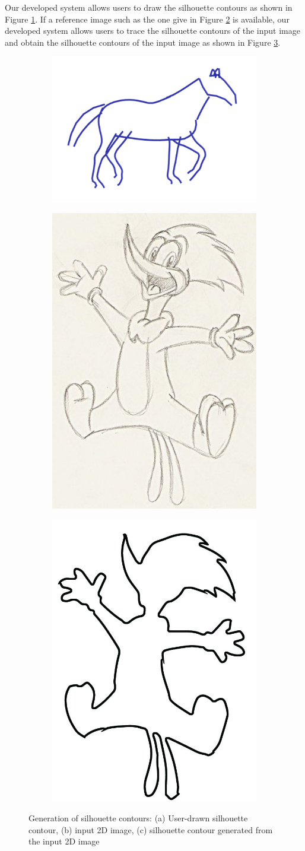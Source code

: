 \documentclass[runningheads]{llncs}
\begin{document}
Our developed system allows users to draw the silhouette contours as shown in Figure \ref{fig:user draw}. If a reference image such as the one give in Figure \ref{fig:input 2d image} is available, our developed system allows users to trace the silhouette contours of the input image and obtain the silhouette contours of the input image as shown in Figure \ref{fig:extracted silhouette}.\\
\begin{figure}[!htbp]
    \centering
    \begin{subfigure}[b]{.4\columnwidth}
    \includegraphics[height=1.6 in]{horse_silhouette.png}
    \caption{}
    \label{fig:user draw}
    \end{subfigure}
    \hspace{2em}
    \begin{subfigure}[b]{.2\columnwidth}
    \includegraphics[height=1.6 in]{woody-woodpecker-sketch-16.jpg}
    \caption{}
    \label{fig:input 2d image}
    \end{subfigure}
    \hspace{2em}
    \begin{subfigure}[b]{.2\columnwidth}
    \includegraphics[height=1.6 in]{extracted_silhouette_from_sketch.jpg}
    \caption{}
    \label{fig:extracted silhouette}
    \end{subfigure}
    \caption{Generation of silhouette contours: (a) User-drawn silhouette contour, (b) input 2D image, (c) silhouette contour generated from the input 2D image}
    \label{fig:different means to input silhouette}
\end{figure}
\end{document}
